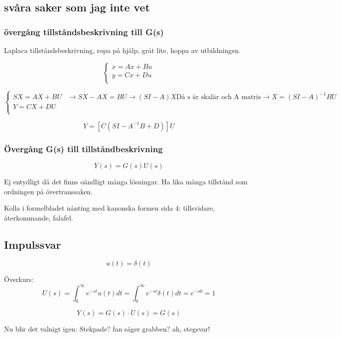 \documentclass[12pt]{article} %
\begin{document}
\subsection{svåra saker som jag inte vet}

\subsubsection{övergång tillståndsbeskrivning till G(s)}

Laplaca tillståndsbeskrivning, ropa på hjälp, gråt lite, hoppa av utbildningen.

\[
    \begin{cases}
        x = Ax + Bu \\
        y = Cx + Du \\
    \end{cases}
\]

\[
    \begin{cases}
        SX = AX + BU & \rightarrow SX - AX = BU \rightarrow (SI - A)X \text{Då s är skalär och A matris} \rightarrow X = (SI - A)^{-1} BU\\
        Y = CX + DU &\\
    \end{cases}
\]

\[
    Y = [C(SI - A^{-1}B + D)]U
\]


\subsubsection{Övergång G(s) till tillståndbeskrivning}

$$Y(s) = G(s)U(s)$$

Ej entydligt då det finns oändligt många lösningar. Ha lika många tillstånd som ordningen på övertranssaken.

Kolla i formelbladet nånting med kanonska formen sida 4: tillsvidare, återkommande, falafel.


\subsection{Impulssvar}

$$u(t) = \delta (t)$$

Överkurs:
$$U(s) = \int^\infty_0  e^{-st} u(t) dt = \int^\infty_0 e^{-st} \delta (t) dt = e^{-s0} = 1$$

$$Y(s) = G(s) \cdot U(s) = G(s)$$


Nu blir det valnigt igen: Stekpade? fan säger grabben? ah, stegsvar!
\end{document}
